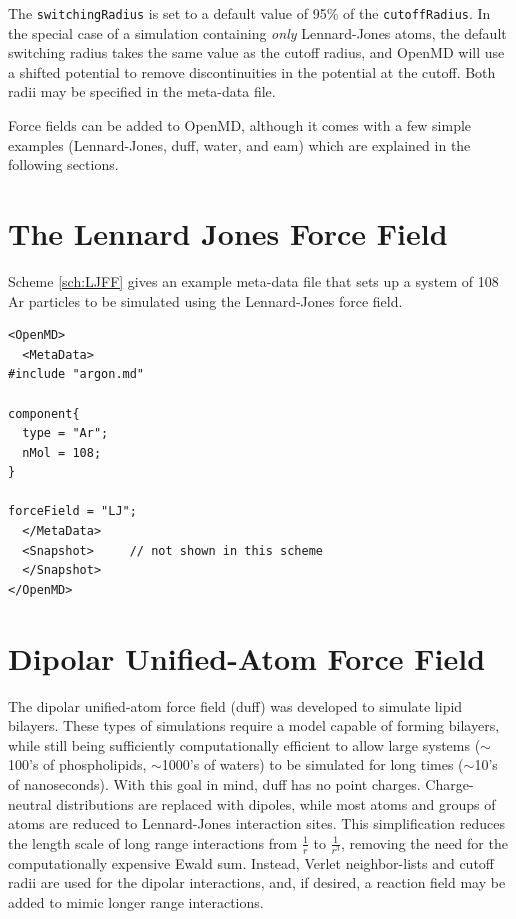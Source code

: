 \documentclass[]{book}
\begin{document}
The {\tt switchingRadius} is set to a default value of 95\% of the
{\tt cutoffRadius}.  In the special case of a simulation containing
{\it only} Lennard-Jones atoms, the default switching radius takes the
same value as the cutoff radius, and {\sc OpenMD} will use a shifted
potential to remove discontinuities in the potential at the cutoff.
Both radii may be specified in the meta-data file.

Force fields can be added to {\sc OpenMD}, although it comes with a few
simple examples (Lennard-Jones, {\sc duff}, {\sc water}, and {\sc
eam}) which are explained in the following sections.

\section{\label{sec:LJPot}The Lennard Jones Force Field}

 Scheme
\ref{sch:LJFF} gives an example meta-data file that
sets up a system of 108 Ar particles to be simulated using the
Lennard-Jones force field.

\begin{lstlisting}[float,caption={[Invocation of the Lennard-Jones
force field] A sample startup file for a small Lennard-Jones
simulation.},label={sch:LJFF}]
<OpenMD>
  <MetaData>
#include "argon.md" 

component{
  type = "Ar";
  nMol = 108;
}

forceField = "LJ";
  </MetaData>
  <Snapshot>     // not shown in this scheme
  </Snapshot>
</OpenMD>
\end{lstlisting}


\section{\label{section:DUFF}Dipolar Unified-Atom Force Field}

The dipolar unified-atom force field ({\sc duff}) was developed to
simulate lipid bilayers. These types of simulations require a model
capable of forming bilayers, while still being sufficiently
computationally efficient to allow large systems ($\sim$100's of
phospholipids, $\sim$1000's of waters) to be simulated for long times
($\sim$10's of nanoseconds). With this goal in mind, {\sc duff} has no
point charges. Charge-neutral distributions are replaced with dipoles,
while most atoms and groups of atoms are reduced to Lennard-Jones
interaction sites. This simplification reduces the length scale of
long range interactions from $\frac{1}{r}$ to $\frac{1}{r^3}$,
removing the need for the computationally expensive Ewald
sum. Instead, Verlet neighbor-lists and cutoff radii are used for the
dipolar interactions, and, if desired, a reaction field may be added
to mimic longer range interactions.
\end{document}
